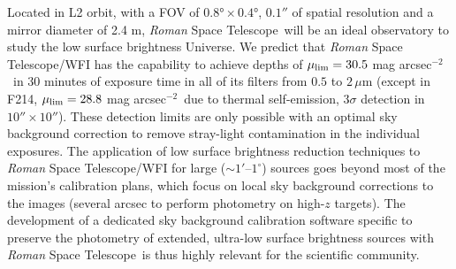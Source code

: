 \documentclass{iau}
\newcommand{\magarc}{mag arcsec\ensuremath{^{\mathrm{-2}}}}
\newcommand{\RST}{\emph{Roman} Space Telescope}
\begin{document}
Located in L2 orbit, with a FOV of $\ang{0.8;;}\times\ang{0.4;;}$, $\ang{;;0.1}$ of spatial resolution and a mirror diameter of 2.4 m, \RST\ will be an ideal observatory to study the low surface brightness Universe. We predict that \RST/WFI has the capability to achieve depths of $\mu_{\rm{lim}}=30.5$ \magarc\ in 30 minutes of exposure time in all of its filters from $0.5$ to $2\,\mu$m (except in F214, $\mu_{\rm{lim}}=28.8$ \magarc\ due to thermal self-emission, 3$\sigma$ detection in $\ang{;;10}\times\ang{;;10}$).  These detection limits are only possible with an optimal sky background correction to remove stray-light contamination in the individual exposures. The application of low surface brightness reduction techniques to \RST/WFI for large ($\sim1'$--$1^{\circ}$) sources goes beyond most of the mission's calibration plans, which focus on local sky background corrections to the images (several arcsec to perform photometry on high-$z$ targets). The development of a dedicated sky background calibration software specific to preserve the photometry of extended, ultra-low surface brightness sources with \RST\ is thus highly relevant for the scientific community.\\
\end{document}
